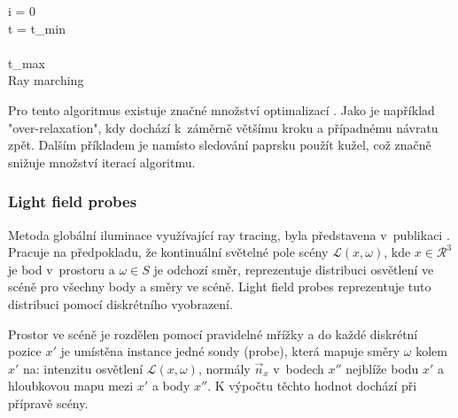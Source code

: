 \begin{center}
	\begin{czechalgorithm}[H] \label{alg:ray_marching}
		i = 0\\
		t = t\_min\\
		\\
		\KwRet t\_max\\
		\caption{Ray marching}
	\end{czechalgorithm}
\end{center}

Pro tento algoritmus existuje značné množství optimalizací \cite{Keinert2014EnhancedST}. Jako je například "over-relaxation", kdy dochází k~záměrně většímu kroku a případnému návratu zpět. Dalším příkladem je namísto sledování paprsku použít kužel, což značně snižuje množství iterací algoritmu.


\subsubsection{Light field probes} \label{sec:light_field_probes}
Metoda globální iluminace využívající ray tracing, byla představena v~publikaci \cite{light_field_probes}. Pracuje na předpokladu, že kontinuální světelné pole scény $\mathcal{L}(x, \omega)$, kde $x \in \mathcal{R}^3$ je bod v~prostoru a $\omega \in S$ je odchozí směr, reprezentuje distribuci osvětlení ve scéně pro všechny body a směry ve scéně. Light field probes reprezentuje tuto distribuci pomocí diskrétního vyobrazení.

Prostor ve scéně je rozdělen pomocí pravidelné mřížky a do každé diskrétní pozice $x'$ je umístěna instance jedné sondy (probe), která mapuje směry $\omega$ kolem $x'$ na: intenzitu osvětlení $\mathcal{L}(x, \omega)$, normály $\vec{n}_x$ v~bodech $x''$ nejblíže bodu $x'$ a hloubkovou mapu mezi $x'$ a body $x''$. K výpočtu těchto hodnot dochází při přípravě scény.

